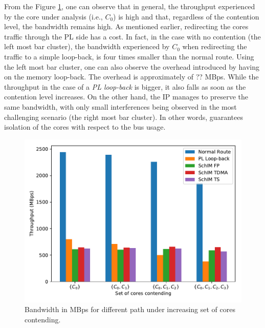     From the Figure \ref{fig:bandwidth_comparison}, one can observe that in general, the throughput experienced by the core under analysis (i.e., $C_{0}$) is high and that, regardless of the contention level, the bandwidth remains high. As mentioned earlier, redirecting the cores traffic through the PL side has a cost. In fact, in the case with no contention (the left most bar cluster), the bandwidth experienced by $C_{0}$ when redirecting the traffic to a simple loop-back, is four times smaller than the normal route.
    Using the left most bar cluster, one can also observe the overhead introduced by having \schim on the memory loop-back. The overhead is approximately of ?? MBps.
    While the throughput in the case of a \emph{PL loop-back} is bigger, it also falls as soon as the contention level increases.
    On the other hand, the \schim IP manages to preserve the same bandwidth, with only small interferences being observed in the most challenging scenario (the right most bar cluster). In other words, \schim guarantees isolation of the cores with respect to the bus usage.
     
    \begin{figure}
      \centering
      \includegraphics[scale=0.5]{images/bw_comparisons.pdf}
      \caption{Bandwidth in MBps for different path under increasing set of cores contending.}
      \label{fig:bandwidth_comparison}
    \end{figure}

